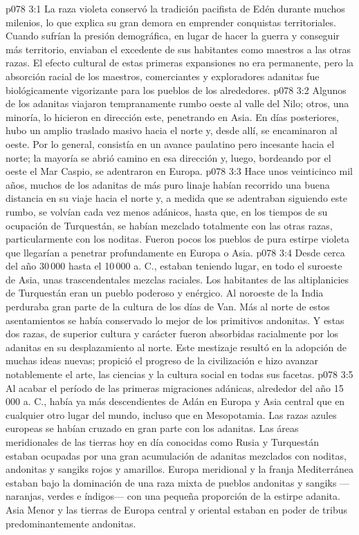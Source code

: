 \vs p078 3:1 La raza violeta conservó la tradición pacifista de Edén durante muchos milenios, lo que explica su gran demora en emprender conquistas territoriales. Cuando sufrían la presión demográfica, en lugar de hacer la guerra y conseguir más territorio, enviaban el excedente de sus habitantes como maestros a las otras razas. El efecto cultural de estas primeras expansiones no era permanente, pero la absorción racial de los maestros, comerciantes y exploradores adanitas fue biológicamente vigorizante para los pueblos de los alrededores.
\vs p078 3:2 Algunos de los adanitas viajaron tempranamente rumbo oeste al valle del Nilo; otros, una minoría, lo hicieron en dirección este, penetrando en Asia. En días posteriores, hubo un amplio traslado masivo hacia el norte y, desde allí, se encaminaron al oeste. Por lo general, consistía en un avance paulatino pero incesante hacia el norte; la mayoría se abrió camino en esa dirección y, luego, bordeando por el oeste el Mar Caspio, se adentraron en Europa.
\vs p078 3:3 Hace unos veinticinco mil años, muchos de los adanitas de más puro linaje habían recorrido una buena distancia en su viaje hacia el norte y, a medida que se adentraban siguiendo este rumbo, se volvían cada vez menos adánicos, hasta que, en los tiempos de su ocupación de Turquestán, se habían mezclado totalmente con las otras razas, particularmente con los noditas. Fueron pocos los pueblos de pura estirpe violeta que llegarían a penetrar profundamente en Europa o Asia.
\vs p078 3:4 Desde cerca del año 30\,000 hasta el 10\,000 a. C., estaban teniendo lugar, en todo el suroeste de Asia, unas trascendentales mezclas raciales. Los habitantes de las altiplanicies de Turquestán eran un pueblo poderoso y enérgico. Al noroeste de la India perduraba gran parte de la cultura de los días de Van. Más al norte de estos asentamientos se había conservado lo mejor de los primitivos andonitas. Y estas dos razas, de superior cultura y carácter fueron absorbidas racialmente por los adanitas en su desplazamiento al norte. Este mestizaje resultó en la adopción de muchas ideas nuevas; propició el progreso de la civilización e hizo avanzar notablemente el arte, las ciencias y la cultura social en todas sus facetas.
\vs p078 3:5 \pc Al acabar el período de las primeras migraciones adánicas, alrededor del año 15\,000 a. C., había ya más descendientes de Adán en Europa y Asia central que en cualquier otro lugar del mundo, incluso que en Mesopotamia. Las razas azules europeas se habían cruzado en gran parte con los adanitas. Las áreas meridionales de las tierras hoy en día conocidas como Rusia y Turquestán estaban ocupadas por una gran acumulación de adanitas mezclados con noditas, andonitas y sangiks rojos y amarillos. Europa meridional y la franja Mediterránea estaban bajo la dominación de una raza mixta de pueblos andonitas y sangiks ---naranjas, verdes e índigos--- con una pequeña proporción de la estirpe adanita. Asia Menor y las tierras de Europa central y oriental estaban en poder de tribus predominantemente andonitas.
